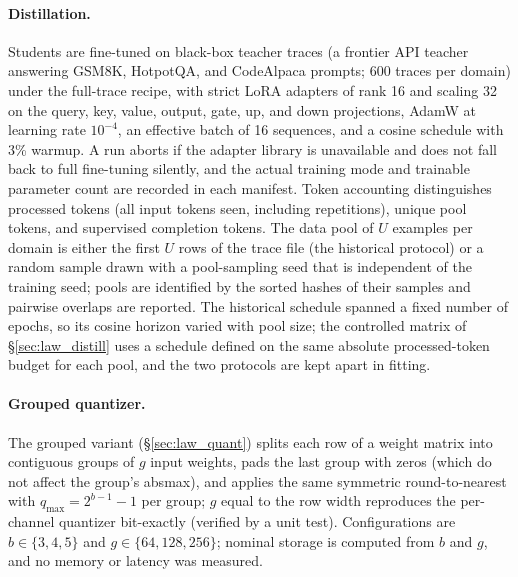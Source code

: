 \paragraph{Distillation.} Students are fine-tuned on black-box teacher
traces (a frontier API teacher answering GSM8K, HotpotQA, and CodeAlpaca
prompts; 600 traces per domain) under the full-trace recipe, with
strict LoRA adapters of rank 16 and scaling 32 on the query, key, value,
output, gate, up, and down projections, AdamW at learning rate
$10^{-4}$, an effective batch of 16 sequences, and a cosine schedule
with 3\% warmup. A run aborts if the adapter library is unavailable and does not fall
back to full fine-tuning silently, and the actual
training mode and trainable parameter count are recorded in each
manifest. Token accounting distinguishes processed tokens (all input
tokens seen, including repetitions), unique pool tokens, and supervised
completion tokens. The data pool of $U$ examples per domain is either
the first $U$ rows of the trace file (the historical protocol) or a
random sample drawn with a pool-sampling seed that is independent of the
training seed; pools are identified by the sorted hashes of their
samples and pairwise overlaps are reported. The historical schedule
spanned a fixed number of epochs, so its cosine horizon varied with
pool size; the controlled matrix of \S\ref{sec:law_distill} uses a schedule
defined on the same absolute processed-token budget for each pool, and
the two protocols are kept apart in fitting.



\paragraph{Grouped quantizer.} The grouped variant (\S\ref{sec:law_quant}) splits each row of a weight matrix into
contiguous groups of $g$ input weights, pads the last group with zeros (which do not affect the group's absmax), and
applies the same symmetric round-to-nearest with $q_{\max}=2^{b-1}-1$ per group; $g$ equal to the row width reproduces
the per-channel quantizer bit-exactly (verified by a unit test). Configurations are $b\in\{3,4,5\}$ and
$g\in\{64,128,256\}$; nominal storage is computed from $b$ and $g$, and no memory or latency was measured.

